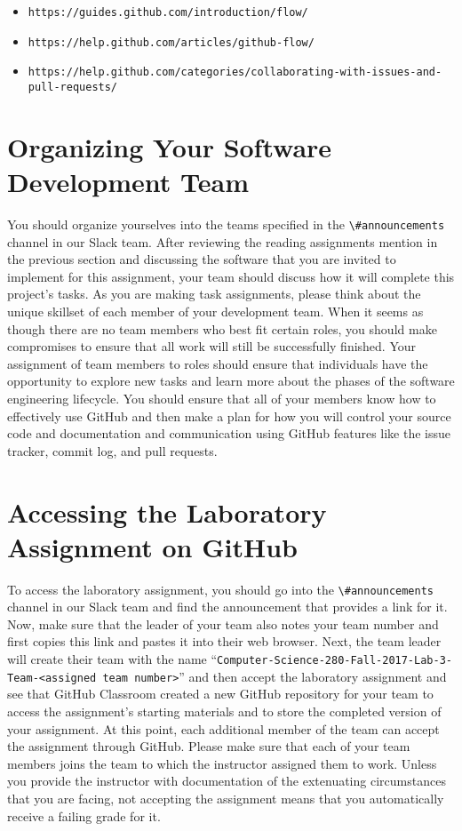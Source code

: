 \documentclass[11pt]{article}
\newcommand{\command}[1]{``\lstinline{#1}''}
\newcommand{\url}[1]{\lstinline{#1}}
\newcommand{\channel}[1]{\lstinline{#1}}
\begin{document}
\begin{itemize}
  \setlength{\itemsep}{0pt}
  \item \url{https://guides.github.com/introduction/flow/}
  \item \url{https://help.github.com/articles/github-flow/}
  \item \url{https://help.github.com/categories/collaborating-with-issues-and-pull-requests/}
\end{itemize}

\vspace*{-1em}

\section*{Organizing Your Software Development Team}

You should organize yourselves into the teams specified in the \channel{\#announcements} channel in our Slack team.
After reviewing the reading assignments mention in the previous section and discussing the software that you are invited
to implement for this assignment, your team should discuss how it will complete this project's tasks. As you are making
task assignments, please think about the unique skillset of each member of your development team. When it seems as
though there are no team members who best fit certain roles, you should make compromises to ensure that all work will
still be successfully finished. Your assignment of team members to roles should ensure that individuals have the
opportunity to explore new tasks and learn more about the phases of the software engineering lifecycle. You should
ensure that all of your members know how to effectively use GitHub and then make a plan for how you will control your
source code and documentation and communication using GitHub features like the issue tracker, commit log, and pull
requests.

\section*{Accessing the Laboratory Assignment on GitHub}

To access the laboratory assignment, you should go into the \channel{\#announcements} channel in our Slack team and find
the announcement that provides a link for it. Now, make sure that the leader of your team also notes your team number
and first copies this link and pastes it into their web browser. Next, the team leader will create their team with the
name \command{Computer-Science-280-Fall-2017-Lab-3-Team-<assigned team number>} and then accept the laboratory
assignment and see that GitHub Classroom created a new GitHub repository for your team to access the assignment's
starting materials and to store the completed version of your assignment. At this point, each additional member of the
team can accept the assignment through GitHub. Please make sure that each of your team members joins the team to which
the instructor assigned them to work. Unless you provide the instructor with documentation of the extenuating
circumstances that you are facing, not accepting the assignment means that you automatically receive a failing grade for
it.
\end{document}
